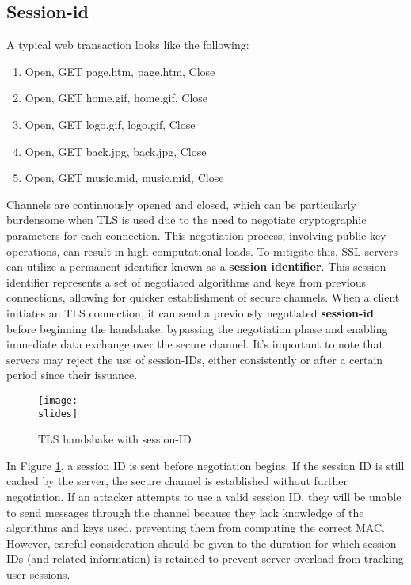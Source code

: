 \subsection{Session-id}
A typical web transaction looks like the following:
\begin{enumerate}
    \item Open, GET page.htm, page.htm, Close
    \item Open, GET home.gif, home.gif, Close
    \item Open, GET logo.gif, logo.gif, Close
    \item Open, GET back.jpg, back.jpg, Close
    \item Open, GET music.mid, music.mid, Close
\end{enumerate}

Channels are continuously opened and closed, which can be particularly burdensome when TLS is used due to the need to negotiate cryptographic parameters for each connection. This negotiation process, involving public key operations, can result in high computational loads. To mitigate this, SSL servers can utilize a \underline{permanent identifier} known as a \textbf{session identifier}. This session identifier represents a set of negotiated algorithms and keys from previous connections, allowing for quicker establishment of secure channels. When a client initiates an TLS connection, it can send a previously negotiated \textbf{session-id} before beginning the handshake, bypassing the negotiation phase and enabling immediate data exchange over the secure channel. It's important to note that servers may reject the use of session-IDs, either consistently or after a certain period since their issuance.

\begin{figure}[h]
    \centering
    \texttt{[image: \\slides]}
    \caption{TLS handshake with session-ID}
    \label{fig:tls-handshake-sessionid}
\end{figure}


In Figure \ref{fig:tls-handshake-sessionid}, a session ID is sent before negotiation begins. If the session ID is still cached by the server, the secure channel is established without further negotiation. If an attacker attempts to use a valid session ID, they will be unable to send messages through the channel because they lack knowledge of the algorithms and keys used, preventing them from computing the correct MAC. However, careful consideration should be given to the duration for which session IDs (and related information) is retained to prevent server overload from tracking user sessions.


